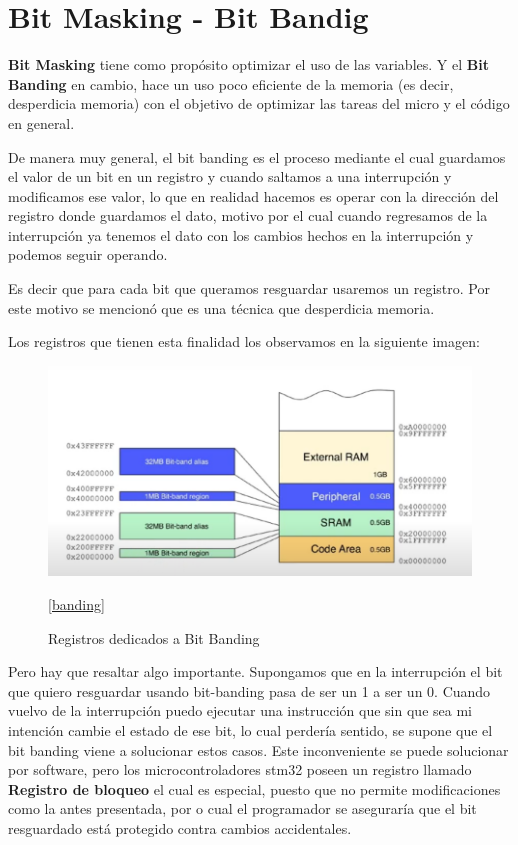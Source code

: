 \documentclass[a4paper,12pt]{report} %
\begin{document}
\section{Bit Masking - Bit Bandig}

\textbf{Bit Masking} tiene como propósito optimizar el uso de las variables. Y el \textbf{Bit Banding} en cambio, hace un uso poco eficiente de la memoria (es decir, desperdicia memoria) con el objetivo de optimizar las tareas del micro y el código en general.

De manera muy general, el bit banding es el proceso mediante el cual guardamos el valor de un bit en un registro y cuando saltamos a una interrupción y modificamos ese valor, lo que en realidad hacemos es operar con la dirección del registro donde guardamos el dato, motivo por el cual cuando regresamos de la interrupción ya tenemos el dato con los cambios hechos en la interrupción y podemos seguir operando.

Es decir que para cada bit que queramos resguardar usaremos un registro. Por este motivo se mencionó que es una técnica que desperdicia memoria.

Los registros que tienen esta finalidad los observamos en la siguiente imagen: 

\begin{figure}[H]
	\centering
	\includegraphics[scale=0.5]{Imagenes/stm/reg_banding}
	\caption{Registros dedicados a Bit Banding}
	\ref{banding}
\end{figure}

Pero hay que resaltar algo importante. Supongamos que en la interrupción el bit que quiero resguardar usando bit-banding pasa de ser un 1 a ser un 0. Cuando vuelvo de la interrupción puedo ejecutar una instrucción que sin que sea mi intención cambie el estado de ese bit, lo cual perdería sentido, se supone que el bit banding viene a solucionar estos casos. Este inconveniente se puede solucionar por software, pero los microcontroladores stm32 poseen un registro llamado \textbf{Registro de bloqueo} el cual es especial, puesto que no permite modificaciones como la antes presentada, por o cual el programador se aseguraría que el bit resguardado está protegido contra cambios accidentales.
\end{document}
